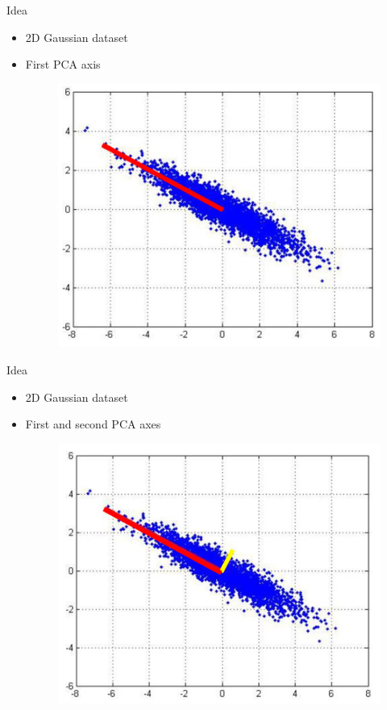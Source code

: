 \documentclass[serif, aspectratio=169]{beamer}
\begin{document}
\begin{frame}{Idea}
    \begin{itemize}
        \item 2D Gaussian dataset
        \item First PCA axis
         \begin{figure}[htpb]
            \begin{center}
                \includegraphics[keepaspectratio, scale=0.6]{pic/pcaData1.JPG}
            \end{center}
        \end{figure}
    \end{itemize}
\end{frame}

\begin{frame}{Idea}
    \begin{itemize}
        \item 2D Gaussian dataset
        \item First and second PCA axes
         \begin{figure}[htpb]
            \begin{center}
                \includegraphics[keepaspectratio, scale=0.6]{pic/pcaData2.JPG}
            \end{center}
        \end{figure}
    \end{itemize}
\end{frame}
\end{document}
